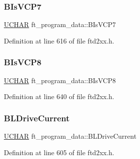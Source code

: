 \subsubsection{\texorpdfstring{B\+Is\+V\+C\+P7}{BIsVCP7}}
{\footnotesize\ttfamily \hyperlink{CatCaloProto40MHz_2inc_2WinTypes_8h_a4f4bb67531a9bf6f0b9c6ad76aeba587}{U\+C\+H\+AR} ft\+\_\+program\+\_\+data\+::\+B\+Is\+V\+C\+P7}



Definition at line 616 of file ftd2xx.\+h.

\mbox{\label{structft__program__data_a48229231c0aa5465553674ee64784b39}} 
\subsubsection{\texorpdfstring{B\+Is\+V\+C\+P8}{BIsVCP8}}
{\footnotesize\ttfamily \hyperlink{CatCaloProto40MHz_2inc_2WinTypes_8h_a4f4bb67531a9bf6f0b9c6ad76aeba587}{U\+C\+H\+AR} ft\+\_\+program\+\_\+data\+::\+B\+Is\+V\+C\+P8}



Definition at line 640 of file ftd2xx.\+h.

\mbox{\label{structft__program__data_a8a55bd4110d2ad36f31260db9c627a5a}} 
\subsubsection{\texorpdfstring{B\+L\+Drive\+Current}{BLDriveCurrent}}
{\footnotesize\ttfamily \hyperlink{CatCaloProto40MHz_2inc_2WinTypes_8h_a4f4bb67531a9bf6f0b9c6ad76aeba587}{U\+C\+H\+AR} ft\+\_\+program\+\_\+data\+::\+B\+L\+Drive\+Current}



Definition at line 605 of file ftd2xx.\+h.

\mbox{\label{structft__program__data_a426b76846e4db7ecd9e4ce2660a2d680}} 
